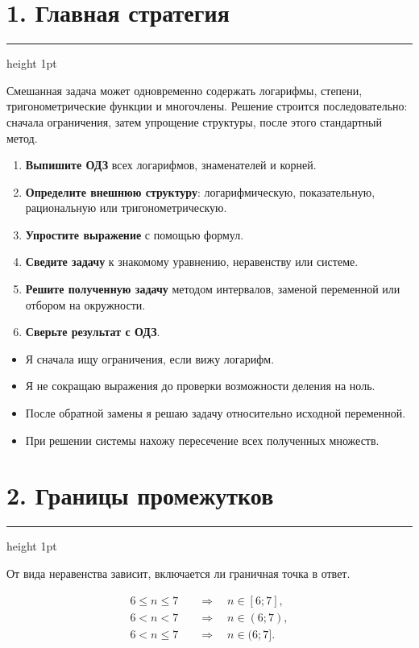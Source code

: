 \documentclass[a4paper,12pt]{article}
\newcommand{\checkitem}{\item[$\square$]}
\newcommand{\important}[1]{\textcolor{darkaccent}{\textbf{#1}}}
\newcommand{\sectionrule}{%
  \vspace{-2mm}
  {\color{lightaccent}\hrule height 1pt}
  \vspace{3mm}
}
\begin{document}
\section*{\textcolor{darkaccent}{1. Главная стратегия}}
\sectionrule

Смешанная задача может одновременно содержать логарифмы, степени,
тригонометрические функции и многочлены. Решение строится
последовательно: сначала ограничения, затем упрощение структуры,
после этого стандартный метод.

\begin{enumerate}
  \item \important{Выпишите ОДЗ} всех логарифмов, знаменателей и корней.
  \item \important{Определите внешнюю структуру}: логарифмическую,
        показательную, рациональную или тригонометрическую.
  \item \important{Упростите выражение} с помощью формул.
  \item \important{Сведите задачу} к знакомому уравнению, неравенству
        или системе.
  \item \important{Решите полученную задачу} методом интервалов,
        заменой переменной или отбором на окружности.
  \item \important{Сверьте результат с ОДЗ}.
\end{enumerate}

\begin{itemize}
  \checkitem Я сначала ищу ограничения, если вижу логарифм.
  \checkitem Я не сокращаю выражения до проверки возможности деления на ноль.
  \checkitem После обратной замены я решаю задачу относительно исходной переменной.
  \checkitem При решении системы нахожу пересечение всех полученных множеств.
\end{itemize}


\section*{\textcolor{darkaccent}{2. Границы промежутков}}
\sectionrule

От вида неравенства зависит, включается ли граничная точка в ответ.

\[
\begin{aligned}
6\le n\le 7
&\quad\Longrightarrow\quad n\in[6;7],\\
6<n<7
&\quad\Longrightarrow\quad n\in(6;7),\\
6<n\le 7
&\quad\Longrightarrow\quad n\in(6;7].
\end{aligned}
\]
\end{document}

